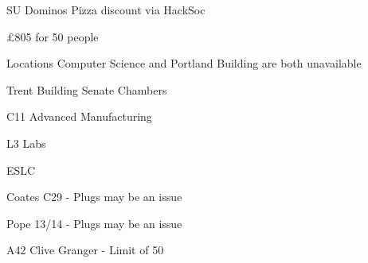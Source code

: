 \documentclass[11pt,hacksoc]{meetingmins}
\begin{document}
\begin{items}
		\subsubitem
		SU Dominos Pizza discount via HackSoc
		
		\subitem
		\pounds 805 for 50 people
		
	\item
	Locations
		\subitem
		Computer Science and Portland Building are both unavailable
		
		\subitem
		Trent Building Senate Chambers
		
		\subitem
		C11 Advanced Manufacturing 
		
		\subitem
		L3 Labs
		
		\subitem 
		ESLC
		
		\subitem
		Coates C29 - Plugs may be an issue
		
		\subitem
		Pope 13/14 - Plugs may be an issue
		
		\subitem
		A42 Clive Granger - Limit of 50
		
\end{items}

\vspace{1em}
\end{document}
